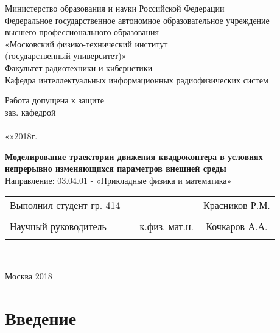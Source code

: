 \documentclass[a4paper]{article}
\begin{document}
	\begin{spacing}{1.5}
		\begin{center}
			\hfill \break
			\normalsize{Министерство образования и науки Российской Федерации}\\
			\normalsize{Федеральное государственное автономное образовательное учреждение}\\
			\normalsize{высшего профессионального образования}\\				
			\normalsize{«Московский физико-технический институт\\
					(государственный университет)»}\\
			
			\normalsize{Факультет радиотехники и кибернетики}\\
			
			\normalsize{Кафедра интеллектуальных информационных радиофизических систем}\\
			\hfill \break
			\begin{flushright} %
				Работа допущена к защите\\
				зав. кафедрой\\
				\underline{\hspace{7cm}}\\
				«\underline{\hspace{1cm}}»\underline{\hspace{4cm}}2018г.
			\end{flushright}
			\hfill \break
			\large\textbf{Моделирование траектории движения квадрокоптера в условиях непрерывно изменяющихся параметров внешней среды}\\
			\normalsize{Направление: 03.04.01 - «Прикладные физика и математика»}
			
		\end{center}
		\hfill \break
		\hfill \break
		\normalsize{ 
		\begin{tabular}{lccc}
			Выполнил студент гр. 414 & \underline{\hspace{3cm}} &  &Красников Р.М. \\\\
			Научный руководитель & \underline{\hspace{3cm}} & к.физ.-мат.н. & Кочкаров А.А. \\\\
		\end{tabular}
	}\\
	\begin{center} Москва 2018 \end{center}
	\thispagestyle{empty}
	\end{spacing}

	\newpage
	
	\tableofcontents %
	\newpage
	
	\newpage
	\section{Введение}
\end{document}

